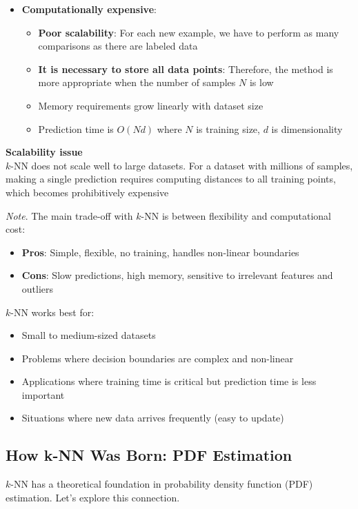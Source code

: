 \documentclass[a4paper]{article}
\theoremstyle{definition}
\begin{document}
\begin{itemize}
\begin{itemize}
        \item Feature selection is crucial
    \end{itemize}
    \item \textbf{Computationally expensive}:
    \begin{itemize}
        \item \textbf{Poor scalability}: For each new example, we have to perform as many comparisons as there are labeled data 
        \item \textbf{It is necessary to store all data points}: Therefore, the method is more appropriate when the number of samples \( N \) is low 
        \item Memory requirements grow linearly with dataset size 
        \item Prediction time is \( O(Nd) \) where \( N \) is training size, \( d \) is dimensionality 
    \end{itemize}
\end{itemize}
\begin{tcolorbox}[
    colback=green!15!white,
    colframe=green!15!white,
    boxrule=0pt,
    arc=0pt,
    halign=center
]
    \textbf{Scalability issue}\\[0.6em]
    \( k \)-NN does not scale well to large datasets. For a dataset with millions of samples, making 
    a single prediction requires computing distances to all training points, which becomes prohibitively
    expensive
\end{tcolorbox}
\textit{Note}. The main trade-off with \( k \)-NN is between flexibility and computational cost:
\begin{itemize}
    \item \textbf{Pros}: Simple, flexible, no training, handles non-linear boundaries 
    \item \textbf{Cons}: Slow predictions, high memory, sensitive to irrelevant features and outliers
\end{itemize}
\( k \)-NN works best for:
\begin{itemize}
    \item Small to medium-sized datasets 
    \item Problems where decision boundaries are complex and non-linear 
    \item Applications where training time is critical but prediction time is less important 
    \item Situations where new data arrives frequently (easy to update)
\end{itemize}
\subsection{How k-NN Was Born: PDF Estimation}
\( k \)-NN has a theoretical foundation in probability density function (PDF) estimation. Let's explore this connection.
\end{document}
